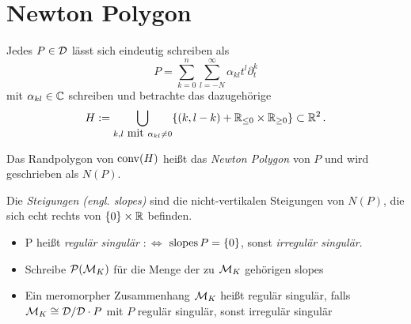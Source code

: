 \section{Newton Polygon} %

Jedes $P\in \mathcal{D}$ lässt sich eindeutig schreiben als
\[ P=\sum^{n}_{k=0}{\sum^{\infty}_{l=-N}{\alpha_{kl}t^l\partial_t^k}} \]
mit $\alpha_{kl}\in\mathbb{C}$ schreiben und betrachte das dazugehörige
\[ H:=\underset{k,l\mbox{ mit }\alpha_{kl}\neq0}{\bigcup}\{ (k,l-k) +
  \mathbb{R}_{\leq 0}\times \mathbb{R}_{\geq 0} \}\subset \mathbb{R}^2 \,. \]

\begin{defn} %
  Das Randpolygon von $\operatorname{conv}(H)$ heißt das \emph{Newton Polygon} von $P$ und
  wird geschrieben als $N(P)$.
\end{defn}

\begin{defn} %
  Die \emph{Steigungen (engl. slopes)} sind die nicht-vertikalen Steigungen von
  $N(P)$, die sich echt rechts von $\{0\}\times\mathbb{R}$ befinden.\\ %
  \begin{itemize}
    \item P heißt \emph{regulär singulär} $:\Leftrightarrow$
      $\operatorname{slopes}{P}=\{0\}$, sonst \emph{irregulär singulär}.

    \item Schreibe $\mathcal{P}(\mathcal{M}_K)$ für die Menge der zu $\mathcal{M}_K$ gehörigen slopes
    \item Ein meromorpher Zusammenhang $\mathcal{M}_K$ heißt regulär singulär, falls
      $\mathcal{M}_K\cong\mathcal{D}/\mathcal{D}\cdot P$ mit $P$ regulär singulär, sonst irregulär
      singulär

  \end{itemize}
\end{defn}

